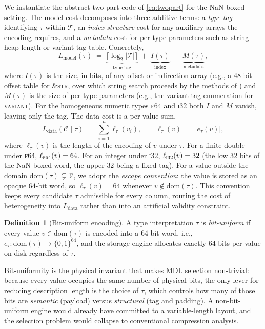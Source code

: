 \documentclass[10pt]{article}
\theoremstyle{definition}
\newtheorem{definition}{Definition}
\theoremstyle{remark}
\newcommand{\Vcal}{\mathcal{V}}
\newcommand{\Ccal}{\mathcal{C}}
\newcommand{\Tcal}{\mathcal{T}}
\newcommand{\Lmodel}{L_{\mathrm{model}}}
\newcommand{\Ldata}{L_{\mathrm{data}}}
\begin{document}
We instantiate the abstract two-part code of \cref{eq:twopart} for the
NaN-boxed setting. The model cost decomposes into three additive
terms: a \emph{type tag} identifying $\tau$ within $\Tcal$, an
\emph{index structure} cost for any auxiliary arrays the encoding
requires, and a \emph{metadata} cost for per-type parameters such as
string-heap length or variant tag table. Concretely,
\begin{equation}\label{eq:model}
\Lmodel(\tau) \;=\; \underbrace{\lceil \log_2 |\Tcal| \rceil}_{\text{type tag}} \;+\; \underbrace{I(\tau)}_{\text{index}} \;+\; \underbrace{M(\tau)}_{\text{metadata}},
\end{equation}
where $I(\tau)$ is the size, in bits, of any offset or indirection array
(e.g., a $48$-bit offset table for \textsc{\&str}, over which string
search proceeds by the methods of \citet{baeza1992}) and $M(\tau)$ is the
size of per-type parameters (e.g., the variant tag enumeration for
\textsc{variant}). For the homogeneous numeric types \textsc{f64} and
\textsc{i32} both $I$ and $M$ vanish, leaving only the tag. The data cost
is a per-value sum,
\begin{equation}\label{eq:data}
\Ldata(\Ccal \mid \tau) \;=\; \sum_{i=1}^{n} \ell_\tau(v_i),
\qquad \ell_\tau(v) \;=\; |e_\tau(v)|,
\end{equation}
where $\ell_\tau(v)$ is the length of the encoding of $v$ under $\tau$.
For a finite double under \textsc{f64}, $\ell_{\textsc{f64}}(v) = 64$. For
an integer under \textsc{i32}, $\ell_{\textsc{i32}}(v) = 32$ (the low
$32$ bits of the NaN-boxed word, the upper $32$ being a fixed tag). For a
value outside the domain $\mathrm{dom}(\tau) \subsetneq \Vcal$, we adopt
the \emph{escape convention}: the value is stored as an opaque $64$-bit
word, so $\ell_\tau(v) = 64$ whenever $v \notin \mathrm{dom}(\tau)$. This
convention keeps every candidate $\tau$ admissible for every column,
routing the cost of heterogeneity into $\Ldata$ rather than into an
artificial validity constraint.

\begin{definition}[Bit-uniform encoding]\label{def:bituniform}
A type interpretation $\tau$ is \emph{bit-uniform} if every value
$v \in \mathrm{dom}(\tau)$ is encoded into a $64$-bit word, i.e.,
$e_\tau : \mathrm{dom}(\tau) \to \{0,1\}^{64}$, and the storage engine
allocates exactly $64$ bits per value on disk regardless of $\tau$.
\end{definition}

Bit-uniformity is the physical invariant that makes MDL selection
non-trivial: because every value occupies the same number of physical
bits, the only lever for reducing description length is the choice of
$\tau$, which controls how many of those bits are \emph{semantic}
(payload) versus \emph{structural} (tag and padding). A non-bit-uniform
engine would already have committed to a variable-length layout, and the
selection problem would collapse to conventional compression analysis.
\end{document}
